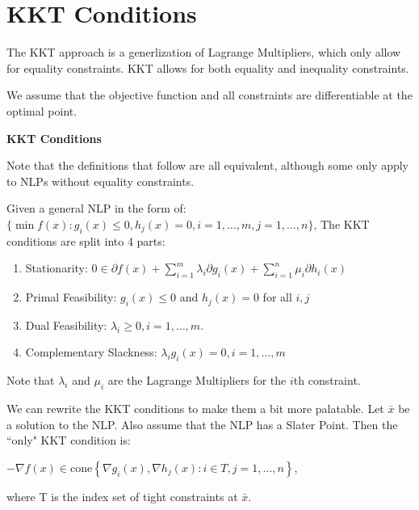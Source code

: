 \documentclass[a4paper]{report}
\begin{document}
\section{KKT Conditions}
The KKT approach is a generlization of Lagrange Multipliers, which only allow for equality constraints. KKT allows for both equality and inequality constraints.
\begin{note}
  We assume that the objective function and all constraints are differentiable at the optimal point.
\end{note}
\begin{definition*}
  \textbf{KKT Conditions} \\
\item Note that the definitions that follow are all equivalent, although some only apply to NLPs without equality constraints.
\item \begin{definition}\label{kkt}
  Given a general NLP in the form of: \\ $\{\min f(x) : g_i(x) \leq 0, h_j(x) = 0, i = 1, \dots, m, j = 1, \dots, n\}$, 
  The KKT conditions are split into 4 parts:
  \begin{enumerate}
    \item Stationarity: $0 \in \partial f(x) + \sum_{i=1}^m \lambda_i \partial g_i(x) + \sum_{i=1}^n \mu_i \partial h_i(x)$
    \item Primal Feasibility: $g_i(x) \leq 0$ and $h_j(x) = 0$ for all $i,j$
    \item Dual Feasibility: $\lambda_i \geq 0, i = 1, \dots, m$.
    \item Complementary Slackness: $\lambda_i g_i(x) = 0, i = 1, \dots, m$
  \end{enumerate}

  Note that $\lambda_i$ and $\mu_i$ are the Lagrange Multipliers for the $i$th constraint.
\end{definition}



\item \begin{definition}\label{kkt}
We can rewrite the KKT conditions to make them a bit more palatable. Let $\bar x$ be a solution to the NLP. Also assume that the NLP has a Slater Point. Then the ``only" KKT condition is:
\begin{center}
  $-\nabla f(x) \in \text{cone}\left\{ \nabla g_i(x), \nabla h_j(x) : i \in T, j = 1, \dots, n \right\}$,
\end{center}
where T is the index set of tight constraints at $\bar x$.
\end{definition}



\end{definition*}
\end{document}
